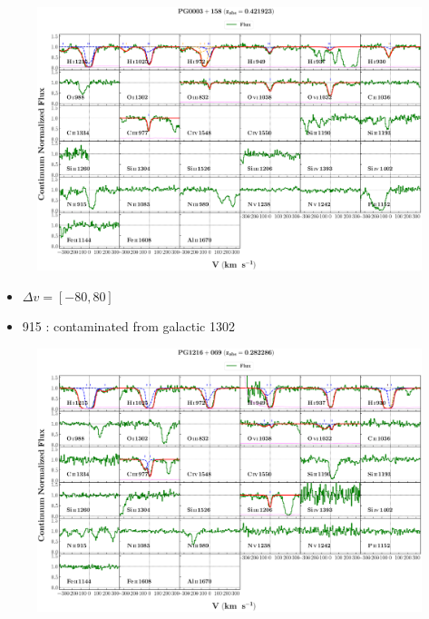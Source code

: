 \documentclass[12pt]{report}
\newcommand\ion[2]{\text{#1\,\textsc{\lowercase{#2}}}}
\begin{document}
\begin{landscape}

    \begin{figure}
    \centering
    \vspace{-20mm}
    \hspace*{-35mm}
    \includegraphics[width=1.25\linewidth]{sys_plots_full/PG0003+158_z=0.421923_sys_plot_full.png}
    \end{figure}
    
\end{landscape}

\begin{itemize}
    \item $\Delta v = [-80,80]$
    \item \ion{N}{ii} 915 : contaminated from galactic \ion{O}{i} 1302
\end{itemize}


\begin{landscape}

    \begin{figure}
    \centering
    \vspace{-20mm}
    \hspace*{-35mm}
    \includegraphics[width=1.25\linewidth]{sys_plots_full/PG1216+069_z=0.282286_sys_plot_full.png}
    \end{figure}
    
\end{landscape}
\end{document}
